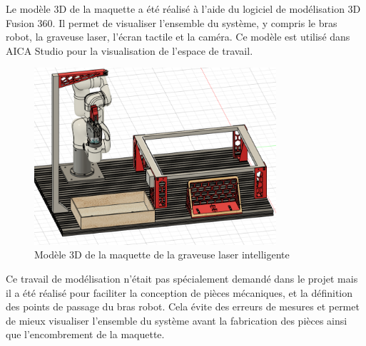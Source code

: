 Le modèle 3D de la maquette a été réalisé à l'aide du logiciel de modélisation 3D Fusion 360. Il permet de visualiser l'ensemble du système, y compris le bras robot, la graveuse laser, l'écran tactile et la caméra. Ce modèle est utilisé dans AICA Studio pour la visualisation de l'espace de travail.

\begin{figure}[H]
    \centering
    \includegraphics[width=0.8\textwidth]{assets/figures/modele_3d.png}
    \caption{Modèle 3D de la maquette de la graveuse laser intelligente}
    \label{fig:maquette_3d}
\end{figure}

Ce travail de modélisation n'était pas spécialement demandé dans le projet mais il a été réalisé pour faciliter la conception de pièces mécaniques, et la définition des points de passage du bras robot. Cela évite des erreurs de mesures et permet de mieux visualiser l'ensemble du système avant la fabrication des pièces ainsi que l'encombrement de la maquette.
